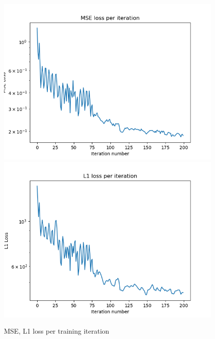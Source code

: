 \begin{figure}[h]
  \centering
  \includegraphics[scale=0.7]{figures/10-16-20-mse-loss.png}
  \includegraphics[scale=0.7]{figures/10-16-20-l1-loss.png}
  \caption{MSE, L1 loss per training iteration}
  \label{fig:loss_log}
\end{figure}

